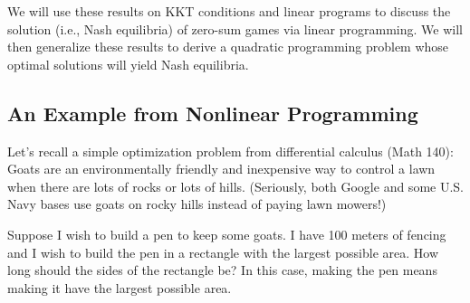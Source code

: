 \begin{remark} We will use these results on KKT conditions and linear programs to discuss the solution (i.e., Nash equilibria) of zero-sum games via linear programming. We will then generalize these results to derive a quadratic programming problem whose optimal solutions will yield Nash equilibria. 
\end{remark}

\subsection{An Example from Nonlinear Programming}
Let's recall a simple optimization problem from differential calculus (Math 140): Goats are an environmentally friendly and inexpensive way to control a lawn when there are lots of rocks or lots of hills. (Seriously, both Google and some U.S. Navy bases use goats on rocky hills instead of paying lawn mowers!) 

Suppose I wish to build a pen to keep some goats. I have 100 meters of fencing and I wish to build the pen in a rectangle with the largest possible area. How long should the sides of the rectangle be? In this case, making the pen  means making it have the largest possible area.

